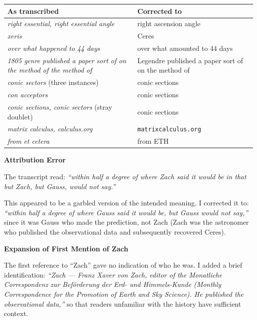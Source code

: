 \documentclass[11pt,a4paper]{article}
\begin{document}
\renewcommand{\arraystretch}{1.35}
\begin{tabular}{>{\raggedright\arraybackslash}p{}
                >{\raggedright\arraybackslash}p{}}
\toprule
\textbf{As transcribed} & \textbf{Corrected to} \\
\midrule
\textit{right essential, right essential angle} & right ascension angle \\
\textit{xeris} & Ceres \\
\textit{over what happened to 44 days} & over what amounted to 44 days \\
\textit{1805 genre published a paper sort of on the method of the method of} & 1805 Legendre published a paper sort of on the method of \\
\textit{conic sectors} (three instances) & conic sections \\
\textit{con acceptors} & conic sections \\
\textit{conic sections, conic sectors} (stray doublet) & conic sections \\
\textit{matrix calculus, calculus.org} & \texttt{matrixcalculus.org} \\
\textit{from et cetera} & from ETH \\
\bottomrule
\end{tabular}

\vspace{0.6em}
\textbf{\large Attribution Error}
\vspace{0.3em}

The transcript read: \textit{``within half a degree of where Zach said it would be in that but Zach, but Gauss, would not say.''}

This appeared to be a garbled version of the intended meaning. I corrected it to: \textit{``within half a degree of where Gauss said it would be, but Gauss would not say,''} since it was Gauss who made the prediction, not Zach (Zach was the astronomer who published the observational data and subsequently recovered Ceres).

\vspace{0.6em}
\textbf{\large Expansion of First Mention of Zach}
\vspace{0.3em}

The first reference to ``Zach'' gave no indication of who he was. I added a brief identification:
\textit{``Zach --- Franz Xaver von Zach, editor of the \textit{Monatliche Correspondenz zur Bef\"orderung der Erd- und Himmels-Kunde} (Monthly Correspondence for the Promotion of Earth and Sky Science). He published the observational data,''}
so that readers unfamiliar with the history have sufficient context.
\end{document}
